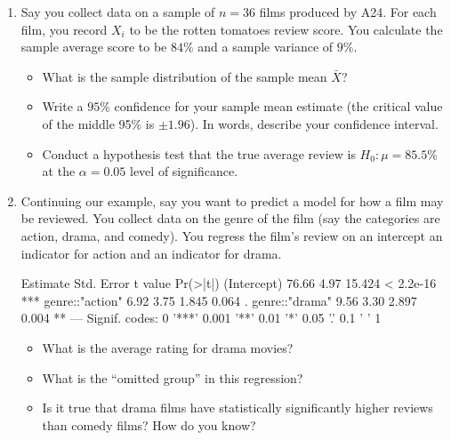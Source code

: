 \documentclass[12pt]{article}
\begin{document}
\begin{enumerate}
  \item Say you collect data on a sample of $n = 36$ films produced by A24. For each film, you record $X_i$ to be the rotten tomatoes review score. You calculate the sample average score to be $84\%$ and a sample variance of $9\%$. 
  \begin{itemize}
    \item What is the sample distribution of the sample mean $\bar{X}$? 
    
    \item Write a $95\%$ confidence for your sample mean estimate (the critical value of the middle 95\% is $\pm 1.96$). In words, describe your confidence interval.
    
    \item Conduct a hypothesis test that the true average review is $H_0: \mu = 85.5\%$ at the $\alpha = 0.05$ level of significance. 
    
  \end{itemize}


  \item Continuing our example, say you want to predict a model for how a film may be reviewed. You collect data on the genre of the film (say the categories are action, drama, and comedy). You regress the film's review on an intercept an indicator for action and an indicator for drama. 
    
    \begin{codeblock}[{}]
                  Estimate Std. Error  t value   Pr(>|t|)    
(Intercept)          76.66       4.97   15.424  < 2.2e-16 ***
genre::"action"       6.92       3.75    1.845      0.064 .
genre::"drama"        9.56       3.30    2.897      0.004 **
---
Signif. codes:  0 '***' 0.001 '**' 0.01 '*' 0.05 '.' 0.1 ' ' 1
    \end{codeblock}

  \begin{itemize}
    \item What is the average rating for drama movies?
    
    \item What is the ``omitted group'' in this regression?
    
    \item Is it true that drama films have statistically significantly higher reviews than comedy films? How do you know?
  \end{itemize}


\end{enumerate}
\end{document}
